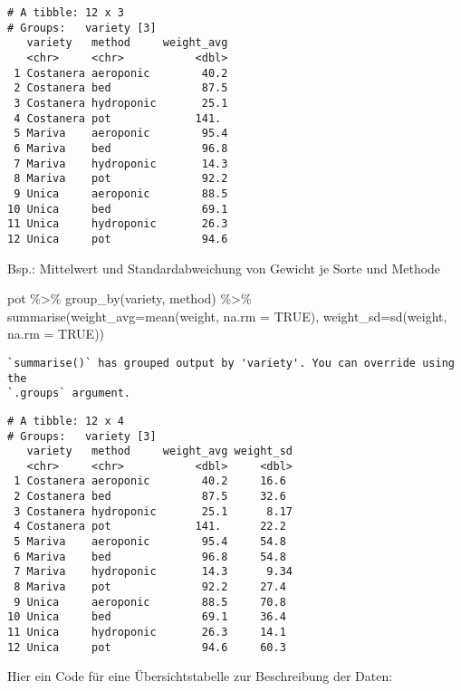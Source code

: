 \documentclass[
  letterpaper,
  DIV=11,
  numbers=noendperiod]{scrartcl}
\newenvironment{Shaded}{\begin{snugshade}}{\end{snugshade}}
\newcommand{\AttributeTok}[1]{\textcolor[rgb]{0.40,0.45,0.13}{#1}}
\newcommand{\ConstantTok}[1]{\textcolor[rgb]{0.56,0.35,0.01}{#1}}
\newcommand{\FunctionTok}[1]{\textcolor[rgb]{0.28,0.35,0.67}{#1}}
\newcommand{\NormalTok}[1]{\textcolor[rgb]{0.00,0.23,0.31}{#1}}
\newcommand{\SpecialCharTok}[1]{\textcolor[rgb]{0.37,0.37,0.37}{#1}}
\begin{document}
\begin{verbatim}
# A tibble: 12 x 3
# Groups:   variety [3]
   variety   method     weight_avg
   <chr>     <chr>           <dbl>
 1 Costanera aeroponic        40.2
 2 Costanera bed              87.5
 3 Costanera hydroponic       25.1
 4 Costanera pot             141. 
 5 Mariva    aeroponic        95.4
 6 Mariva    bed              96.8
 7 Mariva    hydroponic       14.3
 8 Mariva    pot              92.2
 9 Unica     aeroponic        88.5
10 Unica     bed              69.1
11 Unica     hydroponic       26.3
12 Unica     pot              94.6
\end{verbatim}

Bsp.: Mittelwert und Standardabweichung von Gewicht je Sorte und Methode

\begin{Shaded}
\begin{Highlighting}[]
\NormalTok{pot }\SpecialCharTok{\%\textgreater{}\%} \FunctionTok{group\_by}\NormalTok{(variety, method) }\SpecialCharTok{\%\textgreater{}\%} 
  \FunctionTok{summarise}\NormalTok{(}\AttributeTok{weight\_avg=}\FunctionTok{mean}\NormalTok{(weight, }\AttributeTok{na.rm =} \ConstantTok{TRUE}\NormalTok{),}
            \AttributeTok{weight\_sd=}\FunctionTok{sd}\NormalTok{(weight, }\AttributeTok{na.rm =} \ConstantTok{TRUE}\NormalTok{))}
\end{Highlighting}
\end{Shaded}

\begin{verbatim}
`summarise()` has grouped output by 'variety'. You can override using the
`.groups` argument.
\end{verbatim}

\begin{verbatim}
# A tibble: 12 x 4
# Groups:   variety [3]
   variety   method     weight_avg weight_sd
   <chr>     <chr>           <dbl>     <dbl>
 1 Costanera aeroponic        40.2     16.6 
 2 Costanera bed              87.5     32.6 
 3 Costanera hydroponic       25.1      8.17
 4 Costanera pot             141.      22.2 
 5 Mariva    aeroponic        95.4     54.8 
 6 Mariva    bed              96.8     54.8 
 7 Mariva    hydroponic       14.3      9.34
 8 Mariva    pot              92.2     27.4 
 9 Unica     aeroponic        88.5     70.8 
10 Unica     bed              69.1     36.4 
11 Unica     hydroponic       26.3     14.1 
12 Unica     pot              94.6     60.3 
\end{verbatim}

Hier ein Code für eine Übersichtstabelle zur Beschreibung der Daten:
\end{document}
